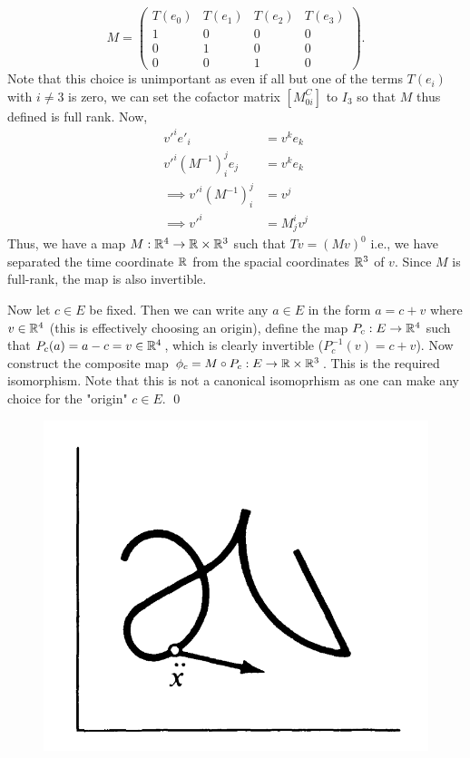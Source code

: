 \begin{enumerate}
\begin{equation}\label{key}
	M = \begin{pmatrix}
		T(e_0)&T(e_1)&T(e_2)&T(e_3)	\\
		1 &0 & 0&0\\
		0&1&0&0\\
		0&0&1&0
	\end{pmatrix}.
\end{equation}
 Note that this choice is unimportant as even if all but one of the terms $T(e_i)$ with $i\neq 3$ is zero, we can set the cofactor matrix $[M^C_{0i}]$ to $I_3$ so that $M$ thus defined is full rank. Now,
\begin{align}
	v'^ie'_i &= v^k e_k\\
	v'^i(M^{-1})_i^{j}e_j &= v^k e_k\\
	\implies v'^i (M^{-1})_i^{j} &= v^j\\
	\implies v'^i &= M^i_j v^j
\end{align}
Thus, we have a map $M: \mathbb{R}^4 \rightarrow \mathbb{R}\times\mathbb{R}^3$ such that $Tv = (Mv)^0$ i.e., we have separated the time coordinate $\mathbb{R}$ from the spacial coordinates $\mathbb{R}^3$ of $v$. Since $M$ is full-rank, the map is also invertible. \par
Now let $c\in E$ be fixed. Then we can write any $a\in E$ in the form $a = c + v$ where $v\in \mathbb{R}^4$ (this is effectively choosing an origin), define the map $P_c: E\rightarrow \mathbb{R}^4$ such that $ P_c(a) = a-c = v\in \mathbb{R}^4 $, which is clearly invertible ($P_c^{-1}(v)  = c+v$). Now construct the composite map $\phi_c = M\circ P_c : E\rightarrow\mathbb{R}\times\mathbb{R}^3$. This is the required isomorphism. Note that this is not a canonical isomoprhism as one can make any choice for the "origin" $c\in E$. \qed

\begin{figure}
	\centering
	\includegraphics[width=0.5\linewidth]{7}
	\caption[Trajectory of motion of a particle]{}
	\label{fig:7}
\end{figure}


\end{enumerate}
